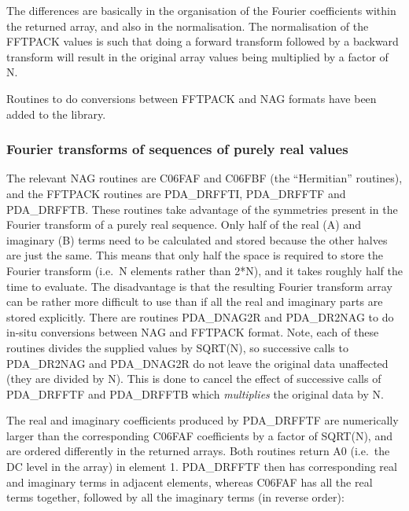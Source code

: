 \documentclass[11pt,twoside]{article}
\newcommand{\htmlref}[2]{#1}
\newcommand{\xlabel}[1]{}
\begin{document}
   The differences are basically in the organisation of the Fourier
   coefficients within the returned array, and also in the
   normalisation. The normalisation of the FFTPACK values is such that
   doing a forward transform followed by a backward transform will
   result in the original array values being multiplied by a factor of
   N.

   Routines to do conversions between FFTPACK and NAG formats have been
   added to the library.


\subsubsection{\xlabel{fourier_transforms_of_sequences_of_purely_real_values}Fourier transforms of sequences of purely real values}

   The relevant NAG routines are C06FAF and C06FBF (the ``Hermitian''
   routines), and the FFTPACK routines are PDA\_DRFFTI, PDA\_DRFFTF and
   PDA\_DRFFTB.
   These routines take advantage of the symmetries present in the Fourier
   transform of a purely real sequence. Only half of the real (A) and
   imaginary (B) terms need to be calculated and stored because the
   other halves are just the same. This means that only half the space
   is required to store the Fourier transform (i.e.\ N elements rather
   than 2*N), and it takes roughly half the time to evaluate. The
   disadvantage is that the resulting Fourier transform array can be
   rather more difficult to use than if all the real and imaginary parts
   are stored explicitly. There are routines
\htmlref{PDA\_DNAG2R}{PDA\_NAG2R} and 
\htmlref{PDA\_DR2NAG}{PDA\_R2NAG}
   to do in-situ conversions between NAG and FFTPACK format. Note, each
   of these routines divides the supplied values by SQRT(N), so
   successive calls to PDA\_DR2NAG and PDA\_DNAG2R do not leave the
   original data
   unaffected (they are divided by N). This is done to cancel the effect
   of successive calls of PDA\_DRFFTF and PDA\_DRFFTB which {\em
   multiplies\/} the original data by N.

   The real and imaginary coefficients produced by PDA\_DRFFTF are
   numerically larger than the corresponding C06FAF coefficients by a
   factor of SQRT(N), and are ordered differently in the returned
   arrays. Both routines return A0 (i.e.\ the DC level in the array) in
   element 1. PDA\_DRFFTF then has corresponding real and imaginary terms in
   adjacent elements, whereas C06FAF has all the real terms together,
   followed by all the imaginary terms (in reverse order):
\end{document}
